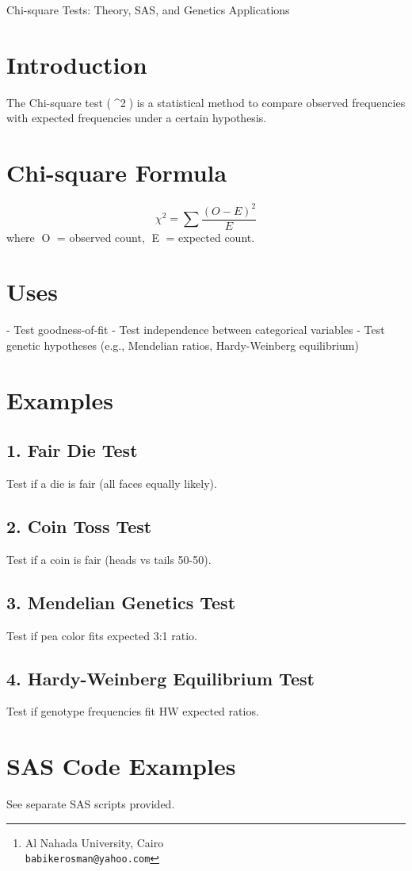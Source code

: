 \documentclass[12pt]{article}
\title{\textcolor{titleColor}{\textbf{\Huge \textbf{ 

 }}}}
\author{B. M. Osman\thanks{Al Nahada University, Cairo \\ \texttt{babikerosman@yahoo.com}}}
\date{\today}
\begin{document}
\maketitle

Chi-square Tests: Theory, SAS, and Genetics Applications

\section*{Introduction}
The Chi-square test (\chi^2) is a statistical method to compare observed frequencies with expected frequencies under a certain hypothesis.

\section*{Chi-square Formula}
\[
\chi^2 = \sum \frac{(O - E)^2}{E}
\]
where O = observed count, E = expected count.

\section*{Uses}
- Test goodness-of-fit
- Test independence between categorical variables
- Test genetic hypotheses (e.g., Mendelian ratios, Hardy-Weinberg equilibrium)

\section*{Examples}

\subsection*{1. Fair Die Test}
Test if a die is fair (all faces equally likely).

\subsection*{2. Coin Toss Test}
Test if a coin is fair (heads vs tails 50-50).

\subsection*{3. Mendelian Genetics Test}
Test if pea color fits expected 3:1 ratio.

\subsection*{4. Hardy-Weinberg Equilibrium Test}
Test if genotype frequencies fit HW expected ratios.

\section*{SAS Code Examples}
See separate SAS scripts provided.
\end{document}
